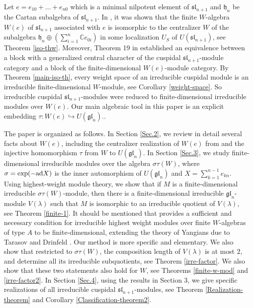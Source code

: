 \documentclass[12pt,a4paper]{amsart}
\numberwithin{equation}{section}
\newcommand{\C}{\mathbb C}
\def\mh{\mathfrak{h}}
\def\sl{\mathfrak{sl}}
\def\gl{\mathfrak{gl}}
\def\l{\lambda}
\begin{document}
Let  $e=e_{10}+\dots+e_{n0}$  which is a minimal nilpotent element of $\sl_{n+1}$ and $\mh_n$ be the Cartan subalgebra of $\sl_{n+1}$.  In \cite{LL}, it was shown that the finite $W$-algebra $W(e)$ of $\sl_{n+1}$ associated with $e$ is isomorphic to the centralizer $W$ of the subalgebra $\mh_n\oplus (\sum_{i=1}^n\C e_{0i})$ in some localization $U_S$
of $U(\sl_{n+1})$, see Theorem \ref{iso-thw}. Moreover, Theorem 19 in \cite{LL} established an equivalence between a block with a generalized central character  of the cuspidal $\mathfrak{sl}_{n+1}$-module category
and a block of the finite-dimensional $W(e)$-module category.
By Theorem \ref{main-iso-th},   every weight space of an irreducible cuspidal module
is an irreducible finite-dimensional $W$-module, see Corollary \ref{weight-space}. So irreducible cuspidal $\mathfrak{sl}_{n+1}$-modules were reduced to finite-dimensional irreducible modules over  $W(e)$. Our main algebraic tool in this paper is an explicit embedding $
 \tau\colon W(e)\hookrightarrow U(\gl_n).
$.

The paper is organized as follows. In Section \ref{Sec.2}, we review in detail several facts about
 $W(e)$, including the centralizer realization of $W(e)$  from \cite{LL} and  the  injective homomorphism $\tau$  from $W$  to $U(\gl_n)$.
In Section \ref{Sec.3},  we study finite-dimensional irreducible modules over the  algebra $\sigma\tau(W)$, where $\sigma=\textup{exp}(-\textup{ad}X)$ is the inner automorphism of $U(\gl_n)$ and
$X=\sum_{k=1}^{n-1} e_{kn}$.  Using  highest-weight module theory, we show that if $M$ is a finite-dimensional irreducible  $\sigma\tau(W)$-module, then there is a finite-dimensional irreducible $\gl_n$-module $V(\l)$ such that $M$ is isomorphic to an irreducible quotient
of  $V(\l)$, see Theorem \ref{finite-1}. It should be mentioned  that \cite{BK2} provides a sufficient and necessary condition for  irreducible highest weight modules over finite $W$-algebras of type $A$ to be finite-dimensional, extending the  theory of Yangians due to Tarasov \cite{Ta} and Drinfeld \cite{Dr}. Our method is more specific and elementary.
 We also show that  restricted to $\sigma\tau(W)$,  the composition length of $V(\l)$ is at most $2$, and determine  all its irreducible subquotients, see Theorem \ref{irre-factor}.  We also show that these two statements
also hold for $W$, see Theorems \ref{finite-w-mod} and \ref{irre-factor2}.
In Section \ref{Sec.4}, using the results in Section 3, we give specific realizations  of
all irreducible cuspidal $\sl_{n+1}$-modules, see Theorem \ref{Realization-theorem} and Corollary \ref{Classification-theorem2}.
\end{document}
